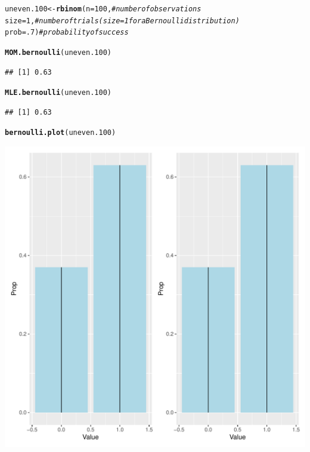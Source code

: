 \documentclass{article}\usepackage[]{graphicx}\usepackage[]{color}
\makeatletter
\def\maxwidth{ %
  \ifdim\Gin@nat@width>\linewidth
    \linewidth
  \else
    \Gin@nat@width
  \fi
}
\newcommand{\hlnum}[1]{\textcolor[rgb]{0.686,0.059,0.569}{#1}}%
\newcommand{\hlcom}[1]{\textcolor[rgb]{0.678,0.584,0.686}{\textit{#1}}}%
\newcommand{\hlstd}[1]{\textcolor[rgb]{0.345,0.345,0.345}{#1}}%
\newcommand{\hlkwb}[1]{\textcolor[rgb]{0.69,0.353,0.396}{#1}}%
\newcommand{\hlkwc}[1]{\textcolor[rgb]{0.333,0.667,0.333}{#1}}%
\newcommand{\hlkwd}[1]{\textcolor[rgb]{0.737,0.353,0.396}{\textbf{#1}}}%
\newenvironment{kframe}{%
 \def\at@end@of@kframe{}%
 \ifinner\ifhmode%
  \def\at@end@of@kframe{\end{minipage}}%
  \begin{minipage}{\columnwidth}%
 \fi\fi%
 \def\FrameCommand##1{\hskip\@totalleftmargin \hskip-\fboxsep
 \colorbox{shadecolor}{##1}\hskip-\fboxsep
     \hskip-\linewidth \hskip-\@totalleftmargin \hskip\columnwidth}%
 \MakeFramed {\advance\hsize-\width
   \@totalleftmargin\z@ \linewidth\hsize
   \@setminipage}}%
 {\par\unskip\endMakeFramed%
 \at@end@of@kframe}
\newenvironment{knitrout}{}{} %
\makeatother
\begin{document}
\begin{enumerate}
\begin{enumerate}
\begin{knitrout}
\color{fgcolor}\begin{kframe}
\begin{alltt}
\hlstd{uneven.100} \hlkwb{<-} \hlkwd{rbinom}\hlstd{(}\hlkwc{n}\hlstd{=}\hlnum{100}\hlstd{,}        \hlcom{#number of observations}
                    \hlkwc{size}\hlstd{=}\hlnum{1}\hlstd{,}        \hlcom{#number of trials (size=1 for a Bernoulli distribution)}
                    \hlkwc{prob}\hlstd{=}\hlnum{.7}\hlstd{)}       \hlcom{#probability of success}

\hlkwd{MOM.bernoulli}\hlstd{(uneven.100)}
\end{alltt}
\begin{verbatim}
## [1] 0.63
\end{verbatim}
\begin{alltt}
\hlkwd{MLE.bernoulli}\hlstd{(uneven.100)}
\end{alltt}
\begin{verbatim}
## [1] 0.63
\end{verbatim}
\begin{alltt}
\hlkwd{bernoulli.plot}\hlstd{(uneven.100)}
\end{alltt}
\end{kframe}
\includegraphics[width=\maxwidth]{figure/unnamed-chunk-7-1} 

\end{knitrout}
\end{enumerate}
\end{enumerate}
\end{document}
